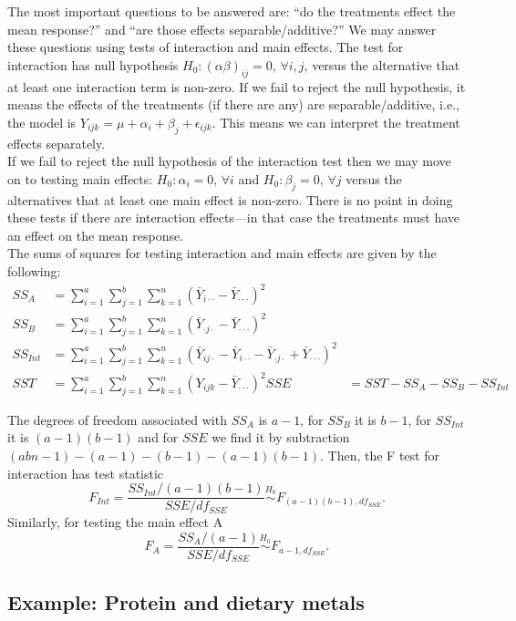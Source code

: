 \documentclass[
]{book}
\begin{document}
The most important questions to be answered are: ``do the treatments effect the mean response?'' and ``are those effects separable/additive?'' We may answer these questions using tests of interaction and main effects.
The test for interaction has null hypothesis \(H_0: (\alpha\beta)_{ij} = 0, \, \forall i,j\), versus the alternative that at least one interaction term is non-zero. If we fail to reject the null hypothesis, it means the effects of the treatments (if there are any) are separable/additive, i.e., the model is \(Y_{ijk} = \mu + \alpha_i + \beta_j + \epsilon_{ijk}\). This means we can interpret the treatment effects separately.\\
If we fail to reject the null hypothesis of the interaction test then we may move on to testing main effects: \(H_0:\alpha_i = 0, \,\forall i\) and \(H_0:\beta_j = 0, \, \forall j\) versus the alternatives that at least one main effect is non-zero. There is no point in doing these tests if there are interaction effects---in that case the treatments must have an effect on the mean response.\\
The sums of squares for testing interaction and main effects are given by the following:
\begin{align*}
SS_A &= \sum_{i=1}^a \sum_{j = 1}^b \sum_{k=1}^n (\bar Y_{i\cdot\cdot} - \bar Y_{\cdot\cdot\cdot})^2\\
SS_B &= \sum_{i=1}^a \sum_{j = 1}^b \sum_{k=1}^n (\bar Y_{\cdot j\cdot} - \bar Y_{\cdot\cdot\cdot})^2\\
SS_{Int} &= \sum_{i=1}^a \sum_{j = 1}^b \sum_{k=1}^n (\bar Y_{ij\cdot} - \bar Y_{i\cdot\cdot} - \bar Y_{\cdot j\cdot} +\bar Y_{\cdot\cdot\cdot})^2\\
SST & = \sum_{i=1}^a \sum_{j = 1}^b \sum_{k=1}^n ( Y_{ijk} -\bar Y_{\cdot\cdot\cdot})^2
SSE & = SST - SS_A - SS_B - SS_{Int}
\end{align*}

The degrees of freedom associated with \(SS_A\) is \(a-1\), for \(SS_B\) it is \(b-1\), for \(SS_{Int}\) it is \((a-1)(b-1)\) and for \(SSE\) we find it by subtraction \((abn-1) - (a-1) - (b-1) - (a-1)(b-1)\). Then, the F test for interaction has test statistic
\[F_{Int} = \frac{SS_{Int} / (a-1)(b-1)}{SSE / df_{SSE}}\stackrel{H_0}{\sim} F_{(a-1)(b-1), df_{SSE}}.\]
Similarly, for testing the main effect A
\[F_A = \frac{SS_{A} / (a-1)}{SSE / df_{SSE}}\stackrel{H_0}{\sim} F_{a-1, df_{SSE}}.\]

\hypertarget{example-protein-and-dietary-metals}{%
\subsection{Example: Protein and dietary metals}\label{example-protein-and-dietary-metals}}
\end{document}
